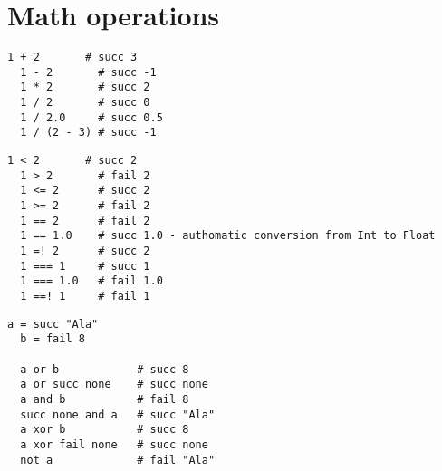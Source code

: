 \chapter{Math operations}

\begin{example}
\begin{lstlisting}[language=intentio]
  1 + 2       # succ 3
  1 - 2       # succ -1
  1 * 2       # succ 2
  1 / 2       # succ 0
  1 / 2.0     # succ 0.5
  1 / (2 - 3) # succ -1
\end{lstlisting}
\end{example}

\begin{example}
\begin{lstlisting}[language=intentio]
  1 < 2       # succ 2
  1 > 2       # fail 2
  1 <= 2      # succ 2
  1 >= 2      # fail 2
  1 == 2      # fail 2
  1 == 1.0    # succ 1.0 - authomatic conversion from Int to Float
  1 =! 2      # succ 2
  1 === 1     # succ 1
  1 === 1.0   # fail 1.0
  1 ==! 1     # fail 1
\end{lstlisting}
\end{example}

\begin{example}
\begin{lstlisting}[language=intentio]
  a = succ "Ala"   
  b = fail 8

  a or b            # succ 8
  a or succ none    # succ none
  a and b           # fail 8
  succ none and a   # succ "Ala"
  a xor b           # succ 8
  a xor fail none   # succ none
  not a             # fail "Ala"
\end{lstlisting}
\end{example}
